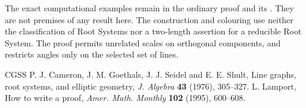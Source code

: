 \documentclass[11pt]{amsart}
\begin{document}
The exact computational examples remain in the ordinary proof and its
. They are not premises of any result here.
The construction and colouring use neither the classification of Root
Systems nor a two-length assertion for a reducible Root System.
The proof permits unrelated scales on orthogonal components, and
restricts angles only on the selected set of lines.

\begin{thebibliography}{CGSS}
P. J. Cameron, J. M. Goethals, J. J. Seidel and E. E. Shult,
Line graphs, root systems, and elliptic geometry,
\emph{J. Algebra} \textbf{43} (1976), 305--327.
L. Lamport, How to write a proof,
\emph{Amer. Math. Monthly} \textbf{102} (1995), 600--608.
\end{thebibliography}
\end{document}
